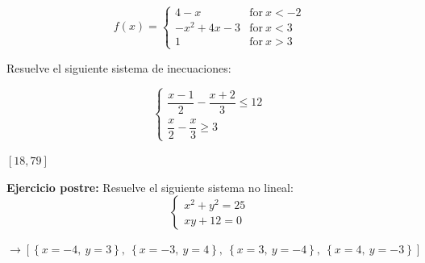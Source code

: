 \documentclass[addpoints,spanish, 12pt,a4paper]{exam}
\begin{document}
\begin{questions}
$$f(x)=\begin{cases} 4 - x & \text{for}\: x < -2 \\- x^{2} + 4 x - 3 & \text{for}\: x < 3 \\1 & \text{for}\: x > 3 \end{cases}$$\begin{solution} \end{solution} 
 
 \question[1] Resuelve el siguiente sistema de inecuaciones:
 
 $$\left\{\begin{matrix}\dfrac{{x - 1}}{2} - \dfrac{{x + 2}}{3} \leq 12 \\  \dfrac{x}{2} - \dfrac{x}{3} \geq 3\end{matrix}\right.$$
\begin{solution} $\left[18, 79\right]$ \end{solution}
 
 \question[1] \textbf{Ejercicio postre:} Resuelve el siguiente sistema no lineal: $$\left\{\begin{matrix}x^2 + y^2 = 25 \\ xy+12=0\end{matrix}\right. $$
\begin{solution}
    $ \to \left[ \left\{ x = -4, \  y = 3\right\}, \  \left\{ x = -3, \  y = 4\right\}, \  \left\{ x = 3, \  y = -4\right\}, \  \left\{ x = 4, \  y = -3\right\}\right]$
\end{solution}


\end{questions}
\end{document}
